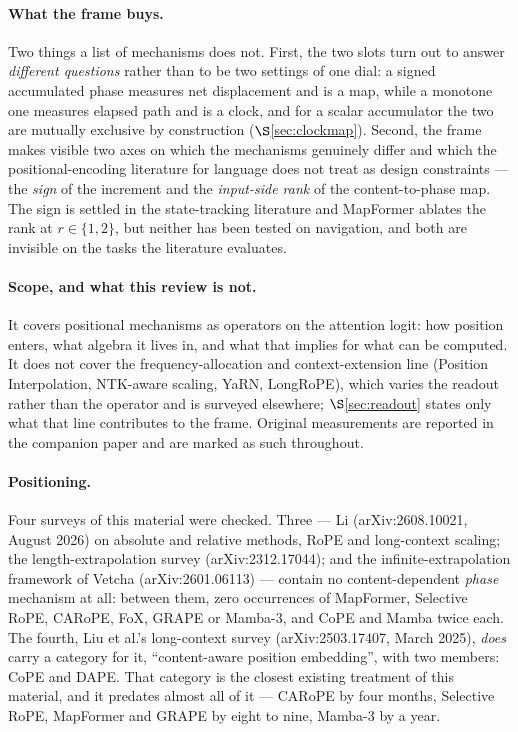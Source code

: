 \documentclass[11pt]{article}
\begin{document}
\paragraph{What the frame buys.} Two things a list of mechanisms does not.
First, the two slots turn out to answer \emph{different questions} rather than to be
two settings of one dial: a signed accumulated phase measures net displacement and is
a map, while a monotone one measures elapsed path and is a clock, and for a scalar
accumulator the two are mutually exclusive by construction ($\S$\ref{sec:clockmap}).
Second, the frame makes visible two axes on which the mechanisms genuinely differ and
which the positional-encoding literature for language does not treat as design
constraints --- the \emph{sign} of the increment and the \emph{input-side rank} of
the content-to-phase map. The sign is settled in the state-tracking literature and
MapFormer ablates the rank at $r\in\{1,2\}$, but neither has been tested on
navigation, and both are invisible on the tasks the literature evaluates.

\paragraph{Scope, and what this review is not.} It covers positional mechanisms as
operators on the attention logit: how position enters, what algebra it lives in, and
what that implies for what can be computed. It does not cover the
frequency-allocation and context-extension line (Position Interpolation, NTK-aware
scaling, YaRN, LongRoPE), which varies the readout rather than the operator and is
surveyed elsewhere; $\S$\ref{sec:readout} states only what that line contributes to
the frame. Original measurements are reported in the companion paper and are
marked as such throughout.

\paragraph{Positioning.} Four surveys of this material were checked. Three --- Li
(arXiv:2608.10021, August 2026) on absolute and relative methods, RoPE and
long-context scaling; the length-extrapolation survey (arXiv:2312.17044); and the
infinite-extrapolation framework of Vetcha (arXiv:2601.06113) --- contain no
content-dependent \emph{phase} mechanism at all: between them, zero occurrences of
MapFormer, Selective RoPE, CARoPE, FoX, GRAPE or Mamba-3, and CoPE and Mamba twice
each. The fourth, Liu et al.'s long-context survey (arXiv:2503.17407, March
2025), \emph{does} carry a category for it, ``content-aware position embedding'',
with two members: CoPE and DAPE. That category is the closest existing treatment of
this material, and it predates almost all of it --- CARoPE by four months, Selective
RoPE, MapFormer and GRAPE by eight to nine, Mamba-3 by a year.
\end{document}
